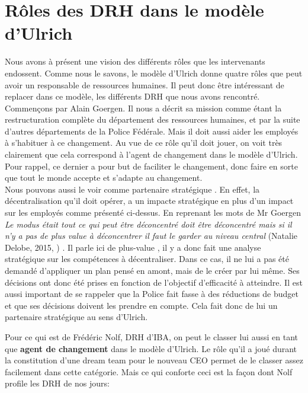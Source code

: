 \section{Rôles des DRH dans le modèle d'Ulrich}

Nous avons à présent une vision des différents rôles que les intervenants endossent. Comme nous le savons, le modèle d'Ulrich donne quatre rôles que peut avoir un responsable de ressources humaines. Il peut donc être intéressant de replacer dans ce modèle, les différents DRH que nous avons rencontré. \\

Commençons par Alain Goergen. Il nous a décrit sa mission comme étant la restructuration complète du département des ressources humaines, et par la suite d'autres départements de la Police Fédérale. Mais il doit aussi aider les employés à s'habituer à ce changement. Au vue de ce rôle qu'il doit jouer, on voit très clairement que cela correspond à l'\og agent de changement \fg{} dans le modèle d'Ulrich. Pour rappel, ce dernier a pour but de faciliter le changement, donc faire en sorte que tout le monde accepte et s'adapte au changement.\\

Nous pouvons aussi le voir comme \og partenaire stratégique \fg{}. En effet, la décentralisation qu'il doit opérer, a un impacte stratégique en plus d'un impact sur les employés comme présenté ci-dessus. En reprenant les mots de Mr Goergen \textit{\og Le modus était tout ce qui peut être déconcentré doit être déconcentré mais si il n’y a pas de plus value à déconcentrer il faut le garder au niveau central \fg{}} (Natalie Delobe, 2015, \cite{tableronde}) . Il parle ici de \og plus-value \fg{}, il y a donc fait une analyse stratégique sur les compétences à décentraliser. Dans ce cas, il ne lui a pas été demandé d'appliquer un plan pensé en amont, mais de le créer par lui même. Ses décisions ont donc été prises en fonction de l'objectif d'efficacité à atteindre. Il est aussi important de se rappeler que la Police fait fasse à des réductions de budget et que ses décisions doivent les prendre en compte. Cela fait donc de lui un \og partenaire stratégique \fg{} au sens d'Ulrich.\\   


Pour ce qui est de Frédéric Nolf, DRH d'IBA, on peut le classer lui aussi en tant que \textbf{agent de changement} dans le modèle d'Ulrich. Le rôle qu'il a joué durant la constitution d'une \og{}dream team\fg{} pour le nouveau CEO permet de le classer assez facilement dans cette catégorie. Mais ce qui conforte ceci est la façon dont Nolf profile les DRH de nos jours:\newline

